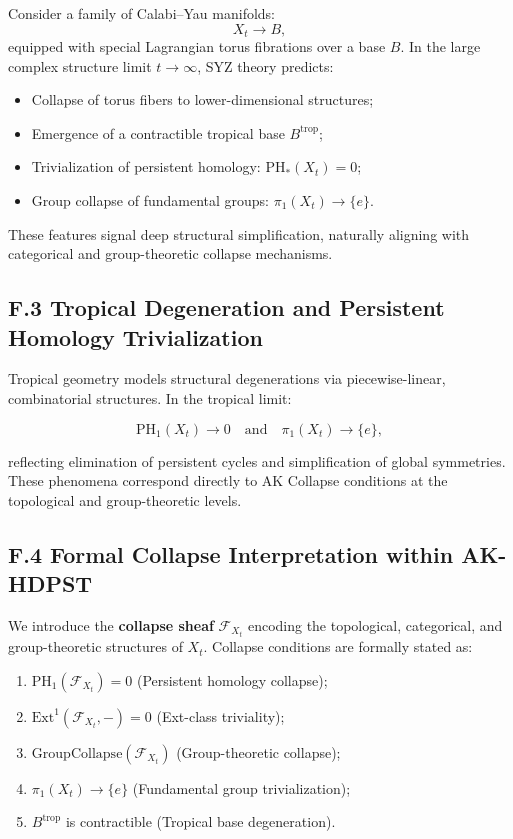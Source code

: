 \documentclass[11pt]{article}
\begin{document}
Consider a family of Calabi–Yau manifolds:
\[
X_t \longrightarrow B,
\]
equipped with special Lagrangian torus fibrations over a base $B$. In the large complex structure limit $t \to \infty$, SYZ theory predicts:

\begin{itemize}
    \item Collapse of torus fibers to lower-dimensional structures;
    \item Emergence of a contractible tropical base $B^{\mathrm{trop}}$;
    \item Trivialization of persistent homology: $\mathrm{PH}_*(X_t) = 0$;
    \item Group collapse of fundamental groups: $\pi_1(X_t) \longrightarrow \{ e \}$.
\end{itemize}

These features signal deep structural simplification, naturally aligning with categorical and group-theoretic collapse mechanisms.

\subsection*{F.3 Tropical Degeneration and Persistent Homology Trivialization}

Tropical geometry models structural degenerations via piecewise-linear, combinatorial structures. In the tropical limit:

\[
\mathrm{PH}_1(X_t) \to 0 \quad \text{and} \quad \pi_1(X_t) \longrightarrow \{ e \},
\]

reflecting elimination of persistent cycles and simplification of global symmetries. These phenomena correspond directly to AK Collapse conditions at the topological and group-theoretic levels.

\subsection*{F.4 Formal Collapse Interpretation within AK-HDPST}

We introduce the \textbf{collapse sheaf} $\mathcal{F}_{X_t}$ encoding the topological, categorical, and group-theoretic structures of $X_t$. Collapse conditions are formally stated as:

\begin{enumerate}
    \item $\mathrm{PH}_1(\mathcal{F}_{X_t}) = 0$ \quad (Persistent homology collapse);
    \item $\mathrm{Ext}^1(\mathcal{F}_{X_t}, -) = 0$ \quad (Ext-class triviality);
    \item $\mathrm{GroupCollapse}(\mathcal{F}_{X_t})$ \quad (Group-theoretic collapse);
    \item $\pi_1(X_t) \longrightarrow \{ e \}$ \quad (Fundamental group trivialization);
    \item $B^{\mathrm{trop}}$ is contractible \quad (Tropical base degeneration).
\end{enumerate}
\end{document}
